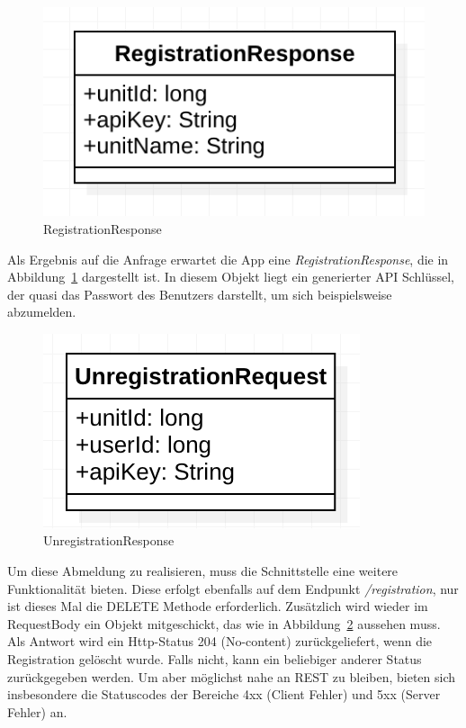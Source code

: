 \begin{figure}[h]
	\centering
	\includegraphics{include/img/registrationresponse}
	\caption{RegistrationResponse}
	\label{fig:registrationResponse}
\end{figure}
Als Ergebnis auf die Anfrage erwartet die App eine \textit{RegistrationResponse}, die in Abbildung~\ref{fig:registrationResponse} dargestellt ist. In diesem Objekt liegt ein generierter API Schlüssel, der quasi das Passwort des Benutzers darstellt, um sich beispielsweise abzumelden.

\begin{figure}[h]
	\centering
	\includegraphics{include/img/unregistrationrequest}
	\caption{UnregistrationResponse}
	\label{fig:unregistrationResponse}
\end{figure}

Um diese Abmeldung zu realisieren, muss die Schnittstelle eine weitere Funktionalität bieten. Diese erfolgt ebenfalls auf dem Endpunkt \textit{/registration}, nur ist dieses Mal die DELETE Methode erforderlich. Zusätzlich wird wieder im RequestBody ein Objekt mitgeschickt, das wie in Abbildung~\ref{fig:unregistrationResponse} aussehen muss. Als Antwort wird ein Http-Status 204 (No-content) zurückgeliefert, wenn die Registration gelöscht wurde. Falls nicht, kann ein beliebiger anderer Status zurückgegeben werden. Um aber möglichst nahe an REST zu bleiben, bieten sich insbesondere die Statuscodes der Bereiche 4xx (Client Fehler) und 5xx (Server Fehler) an.

